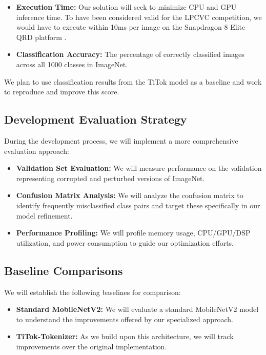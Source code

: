 \documentclass[11pt, oneside]{article}   	%
\begin{document}
\begin{itemize}
	\item \textbf{Execution Time:} Our solution will seek to minimize CPU and GPU inference time. To have been considered valid for the LPCVC competition, we would have to execute within 10ms per image on the Snapdragon 8 Elite QRD platform .

	\item \textbf{Classification Accuracy:} The percentage of correctly classified images across all 1000 classes in ImageNet.

\end{itemize}

We plan to use classification results from the TiTok model \cite{yu2024imageworth32tokens} as a baseline and work to reproduce and improve this score. 

\subsection*{Development Evaluation Strategy}

During the development process, we will implement a more comprehensive evaluation approach:

\begin{itemize}

	\item \textbf{Validation Set Evaluation:} We will measure performance on the validation representing corrupted and perturbed versions of ImageNet.

	\item \textbf{Confusion Matrix Analysis:} We will analyze the confusion matrix to identify frequently misclassified class pairs and target these specifically in our model refinement.

	\item \textbf{Performance Profiling:} We will profile memory usage, CPU/GPU/DSP utilization, and power consumption to guide our optimization efforts.
\end{itemize}

\subsection*{Baseline Comparisons}

We will establish the following baselines for comparison:

\begin{itemize}

	\item \textbf{Standard MobileNetV2:} We will evaluate a standard MobileNetV2 model to understand the improvements offered by our specialized approach.

    \item \textbf{TiTok-Tokenizer:} As we build upon this architecture, we will track improvements over the original implementation.

\end{itemize}
\end{document}
